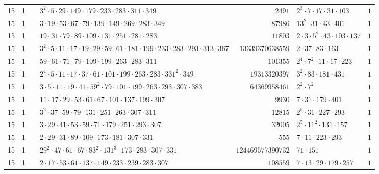 \documentclass[a4paper,twoside,10pt]{report}
\renewcommand{\checkmark}{\text{\ding{51}}}
\newcommand{\cross}{\text{\ding{55}}}
\begin{document}
\begin{longtable}{rrcp{5cm}rp{5cm}r}
15 & 1 & \cross& $3^{2} \cdot 5 \cdot 29 \cdot 149 \cdot 179 \cdot 233 \cdot 283 \cdot 311 \cdot 349$ & $2491$ & $2^{3} \cdot 7 \cdot 17 \cdot 31 \cdot 103$ & $1$\\
15 & 1 & \cross& $3 \cdot 19 \cdot 53 \cdot 67 \cdot 79 \cdot 139 \cdot 149 \cdot 269 \cdot 283 \cdot 349$ & $87986$ & $13^{2} \cdot 31 \cdot 43 \cdot 401$ & $1$\\
15 & 1 & \cross& $19 \cdot 31 \cdot 79 \cdot 89 \cdot 109 \cdot 131 \cdot 251 \cdot 281 \cdot 283$ & $11803$ & $2 \cdot 3 \cdot 5^{2} \cdot 43 \cdot 103 \cdot 137$ & $1$\\
15 & 1 & \checkmark& $3^{2} \cdot 5 \cdot 11 \cdot 17 \cdot 19 \cdot 29 \cdot 59 \cdot 61 \cdot 181 \cdot 199 \cdot 233 \cdot 283 \cdot 293 \cdot 313 \cdot 367$ & $13339370638559$ & $2 \cdot 37 \cdot 83 \cdot 163$ & $1$\\
15 & 1 & \cross& $59 \cdot 61 \cdot 71 \cdot 79 \cdot 109 \cdot 199 \cdot 263 \cdot 283 \cdot 311$ & $101355$ & $2^{4} \cdot 7^{2} \cdot 11 \cdot 17 \cdot 223$ & $1$\\
15 & 1 & \checkmark& $2^{4} \cdot 5 \cdot 11 \cdot 17 \cdot 37 \cdot 61 \cdot 101 \cdot 199 \cdot 263 \cdot 283 \cdot 331^{2} \cdot 349$ & $19313320397$ & $3^{2} \cdot 83 \cdot 181 \cdot 431$ & $1$\\
15 & 1 & \checkmark& $3 \cdot 5 \cdot 11 \cdot 19 \cdot 41 \cdot 59^{2} \cdot 79 \cdot 101 \cdot 199 \cdot 263 \cdot 293 \cdot 307 \cdot 383$ & $64369958461$ & $2^{2} \cdot 7^{2}$ & $1$\\
15 & 1 & \cross& $11 \cdot 17 \cdot 29 \cdot 53 \cdot 61 \cdot 67 \cdot 101 \cdot 137 \cdot 199 \cdot 307$ & $9930$ & $7 \cdot 31 \cdot 179 \cdot 401$ & $1$\\
15 & 1 & \cross& $3^{2} \cdot 37 \cdot 59 \cdot 79 \cdot 131 \cdot 251 \cdot 263 \cdot 307 \cdot 311$ & $12815$ & $2^{5} \cdot 31 \cdot 227 \cdot 293$ & $1$\\
15 & 1 & \cross& $3 \cdot 29 \cdot 41 \cdot 53 \cdot 59 \cdot 71 \cdot 179 \cdot 251 \cdot 293 \cdot 307$ & $32005$ & $2^{5} \cdot 11^{2} \cdot 131 \cdot 157$ & $1$\\
15 & 1 & \cross& $2 \cdot 29 \cdot 31 \cdot 89 \cdot 109 \cdot 173 \cdot 181 \cdot 307 \cdot 331$ & $555$ & $7 \cdot 11 \cdot 223 \cdot 293$ & $1$\\
15 & 1 & \checkmark& $29^{2} \cdot 47 \cdot 61 \cdot 67 \cdot 83^{2} \cdot 131^{3} \cdot 173 \cdot 283 \cdot 307 \cdot 331$ & $124469577390732$ & $71 \cdot 151$ & $1$\\
15 & 1 & \cross& $2 \cdot 17 \cdot 53 \cdot 61 \cdot 137 \cdot 149 \cdot 233 \cdot 239 \cdot 283 \cdot 307$ & $108559$ & $7 \cdot 13 \cdot 29 \cdot 179 \cdot 257$ & $1$\\

\end{longtable}
\end{document}

